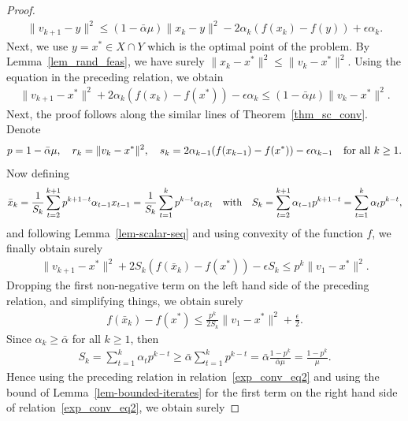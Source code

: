 \documentclass{article}
\def\a{\alpha}
\theoremstyle{plain}
\theoremstyle{definition}
\theoremstyle{remark}
\begin{document}
\begin{proof}
    \begin{align*}
        \|v_{k+1} - y\|^2 \leq (1- \bar \a \mu) \| x_{k} -y \|^2 - 2 \a_k  (f(x_k) - f(y)) + \epsilon \a_k .
    \end{align*}
    Next, we use $y = x^* \in X \cap Y$ which is the optimal point of the problem. By Lemma~\ref{lem_rand_feas}, we have surely $\|x_k-x^*\|^2\le \|v_k-x^*\|^2$. Using the equation in the preceding relation, we obtain
    \begin{align*}
        \|v_{k+1} - x^*\|^2 + 2 \a_k  (f(x_k) - f(x^*)) - \epsilon \a_k \leq (1- \bar \a \mu) \| v_{k} - x^* \|^2 .
    \end{align*}
    Next, the proof follows along the similar lines of Theorem~\ref{thm_sc_conv}. Denote
    \begin{align*}
        p = 1- \bar \a \mu, \quad r_k=\|v_k - x^*\|^2,\quad s_k=2\a_{k-1} (f(x_{k-1}) - f(x^*)) - \epsilon \a_{k-1} \quad\hbox{for all }k\ge1.
    \end{align*}
    Now defining
    \begin{align*}
        \bar x_{k}=\frac{1}{S_k}\sum_{t=2}^{k+1} p^{k+1-t} \a_{t-1} x_{t-1} = \frac{1}{S_k}\sum_{t=1}^{k} p^{k-t} \a_{t} x_{t} \quad\hbox{with}\quad S_k = \sum_{t=2}^{k+1} \a_{t-1} p^{k+1-t} = \sum_{t=1}^{k} \a_{t} p^{k-t} ,
    \end{align*}
    and following Lemma~\ref{lem-scalar-seq} and using convexity of the function $f$, we finally obtain surely
    \begin{align*}
        \|v_{k+1} - x^*\|^2 + 2 S_k \left(f(\bar x_{k})-f(x^*)\right) - \epsilon S_k \leq p^k \|v_1 - x^* \|^2 . \nonumber
    \end{align*}
    Dropping the first non-negative term on the left hand side of the preceding relation, and simplifying things, we obtain surely
    \begin{align}
        f(\bar x_{k})-f(x^*) \leq \frac{p^k}{2 S_k} \|v_1 - x^* \|^2 + \frac{\epsilon}{2} . \label{exp_conv_eq2}
    \end{align}
    Since $\a_k \geq \bar \a$ for all $k \geq 1$, then
    \begin{align*}
        S_k = \sum_{t=1}^{k} \a_{t} p^{k-t} \geq \bar \a \sum_{t=1}^{k} p^{k-t} = \bar \a \frac{1-p^{k}}{\bar \a \mu} = \frac{1-p^{k}}{\mu} .
    \end{align*}
    Hence using the preceding relation in relation~\eqref{exp_conv_eq2} and using the bound of Lemma~\ref{lem-bounded-iterates} for the first term on the right hand side of relation~\eqref{exp_conv_eq2}, we obtain surely

\end{proof}
\end{document}
